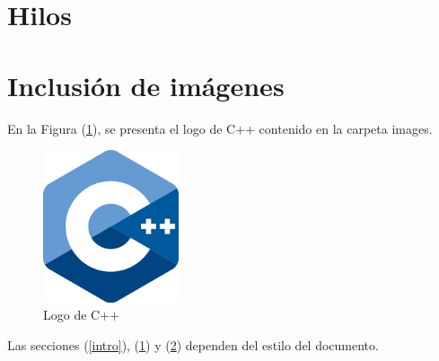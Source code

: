 \documentclass{article}
\begin{document}
\section{Hilos} \label{contenido}
\newpage
\section{Inclusión de imágenes} \label{imagenes}


En la Figura (\ref{fig:cpplogo}), se presenta el logo de C++ contenido en la carpeta images.

\begin{figure}[h]
\includegraphics[width=4cm]{cpplogo.png}
\centering
\caption{Logo de C++}
\label{fig:cpplogo}
\end{figure}

Las secciones (\ref{intro}), (\ref{contenido}) y (\ref{imagenes}) dependen del estilo del documento.



\end{document}
